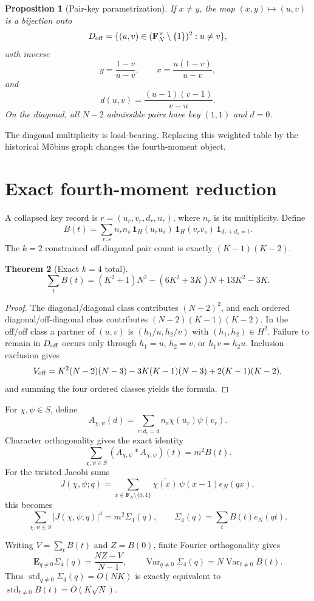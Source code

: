 \documentclass[11pt]{article}
\newtheorem{theorem}{Theorem}[section]
\newtheorem{proposition}[theorem]{Proposition}
\newcommand{\F}{\mathbf F}
\newcommand{\E}{\mathbf E}
\newcommand{\Var}{\operatorname{Var}}
\newcommand{\1}{\mathbf 1}
\newcommand{\eN}[1]{e_N\!\left(#1\right)}
\begin{document}
\begin{proposition}[Pair-key parametrization]
If $x\ne y$, the map $(x,y)\mapsto(u,v)$ is a bijection onto
\[
D_{\rm off}=\{(u,v)\in(\F_N^\times\setminus\{1\})^2:u\ne v\},
\]
with inverse
\[
y=\frac{1-v}{u-v},\qquad x=\frac{u(1-v)}{u-v},
\]
and
\[
d(u,v)=\frac{(u-1)(v-1)}{v-u}.
\]
On the diagonal, all $N-2$ admissible pairs have key $(1,1)$ and $d=0$.
\end{proposition}

The diagonal multiplicity is load-bearing. Replacing this weighted table by the historical M\"obius graph changes the fourth-moment object.

\section{Exact fourth-moment reduction}
A collapsed key record is $r=(u_r,v_r,d_r,n_r)$, where $n_r$ is its multiplicity. Define
\[
B(t)=\sum_{r,s}n_rn_s\,\1_H(u_ru_s)\,\1_H(v_rv_s)\,\1_{d_r+d_s=t}.
\]
The $k=2$ constrained off-diagonal pair count is exactly $(K-1)(K-2)$.

\begin{theorem}[Exact $k=4$ total]
\[
\sum_tB(t)=(K^2+1)N^2-(6K^2+3K)N+13K^2-3K.
\]
\end{theorem}

\begin{proof}
The diagonal/diagonal class contributes $(N-2)^2$, and each ordered diagonal/off-diagonal class contributes $(N-2)(K-1)(K-2)$. In the off/off class a partner of $(u,v)$ is $(h_1/u,h_2/v)$ with $(h_1,h_2)\in H^2$. Failure to remain in $D_{\rm off}$ occurs only through $h_1=u$, $h_2=v$, or $h_1v=h_2u$. Inclusion--exclusion gives
\[
V_{\rm off}=K^2(N-2)(N-3)-3K(K-1)(N-3)+2(K-1)(K-2),
\]
and summing the four ordered classes yields the formula.
\end{proof}

For $\chi,\psi\in S$, define
\[
A_{\chi,\psi}(d)=\sum_{r:d_r=d}n_r\chi(u_r)\psi(v_r).
\]
Character orthogonality gives the exact identity
\[
\sum_{\chi,\psi\in S}(A_{\chi,\psi}*A_{\chi,\psi})(t)=m^2B(t).
\]
For the twisted Jacobi sums
\[
J(\chi,\psi;q)=\sum_{x\in\F_N\setminus\{0,1\}}\overline{\chi(x)}\,\psi(x-1)\eN{qx},
\]
this becomes
\[
\sum_{\chi,\psi\in S}|J(\chi,\psi;q)|^4=m^2\Sigma_4(q),\qquad
\Sigma_4(q)=\sum_tB(t)\eN{qt}.
\]

Writing $V=\sum_tB(t)$ and $Z=B(0)$, finite Fourier orthogonality gives
\[
\E_{q\ne0}\Sigma_4(q)=\frac{NZ-V}{N-1},
\qquad
\Var_{q\ne0}\Sigma_4(q)=N\Var_{t\ne0}B(t).
\]
Thus $\operatorname{std}_{q\ne0}\Sigma_4(q)=O(NK)$ is exactly equivalent to $\operatorname{std}_{t\ne0}B(t)=O(K\sqrt N)$.
\end{document}
